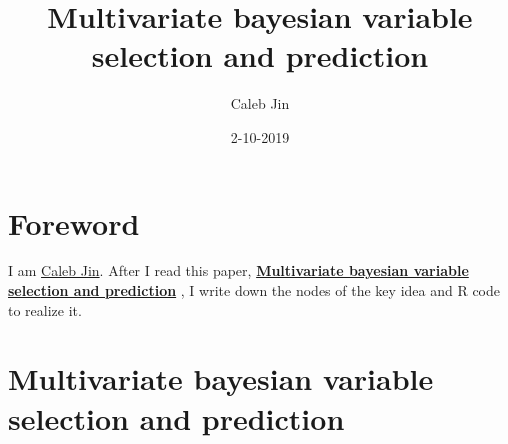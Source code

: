 \documentclass[]{book}
\title{Multivariate bayesian variable selection and prediction}
\author{Caleb Jin}
\date{2-10-2019}
\begin{document}
\maketitle

{
\setcounter{tocdepth}{1}
\tableofcontents
}
\hypertarget{foreword}{%
\chapter{Foreword}\label{foreword}}

I am \href{https://www.sjin.name/}{Caleb Jin}. After I read this paper, \textbf{\href{https://rss.onlinelibrary.wiley.com/doi/abs/10.1111/1467-9868.00144}{Multivariate bayesian variable selection and prediction}} \citep{Brown}, I write down the nodes of the key idea and R code to realize it.

\newcommand\T{{\top}}
\newcommand\ubeta{{\boldsymbol \beta}}
\newcommand\uSigma{{\boldsymbol \Sigma}}
\newcommand\uepsilon{{\boldsymbol \epsilon}}
\newcommand\umu{{\boldsymbol \mu}}
\newcommand\utheta{{\boldsymbol \theta}}
\newcommand\ubg{{\boldsymbol \gamma}}
\newcommand\uphi{{\boldsymbol \phi}}
\newcommand\uxi{{\boldsymbol \xi}}

\newcommand\0{{\bf 0}}
\newcommand\uA{{\bf A}}
\newcommand\ua{{\bf a}}
\newcommand\uB{{\bf B}}
\newcommand\ub{{\bf b}}
\newcommand\uC{{\bf C}}
\newcommand\uD{{\bf D}}
\newcommand\uE{{\bf E}}
\newcommand\ue{{\bf e}}
\newcommand\uH{{\bf H}}
\newcommand\uI{{\bf I}}
\newcommand\uK{{\bf K}}
\newcommand\uM{{\bf M}}
\newcommand\uQ{{\bf Q}}
\newcommand\uV{{\bf V}}
\newcommand\uX{{\bf X}}
\newcommand\ux{{\bf x}}
\newcommand\uY{{\bf Y}}
\newcommand\uy{{\bf y}}
\newcommand\uz{{\bf z}}
\newcommand\diag{{\rm diag}}
\newcommand{\tr}{{\text tr}}

\hypertarget{multivariate-bayesian-variable-selection-and-prediction}{%
\chapter{Multivariate bayesian variable selection and prediction}\label{multivariate-bayesian-variable-selection-and-prediction}}
\end{document}
